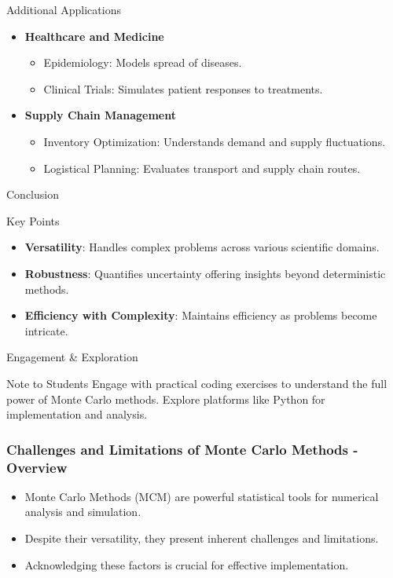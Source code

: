 \documentclass[aspectratio=169]{beamer}
\begin{document}
\begin{frame}{Additional Applications}
    \begin{itemize}
        \item \textbf{Healthcare and Medicine}
            \begin{itemize}
                \item Epidemiology: Models spread of diseases.
                \item Clinical Trials: Simulates patient responses to treatments.
            \end{itemize}
        \item \textbf{Supply Chain Management}
            \begin{itemize}
                \item Inventory Optimization: Understands demand and supply fluctuations.
                \item Logistical Planning: Evaluates transport and supply chain routes.
            \end{itemize}
    \end{itemize}
\end{frame}

\begin{frame}{Conclusion}
    \begin{block}{Key Points}
        \begin{itemize}
            \item \textbf{Versatility}: Handles complex problems across various scientific domains.
            \item \textbf{Robustness}: Quantifies uncertainty offering insights beyond deterministic methods.
            \item \textbf{Efficiency with Complexity}: Maintains efficiency as problems become intricate.
        \end{itemize}
    \end{block}
\end{frame}

\begin{frame}{Engagement & Exploration}
    \begin{block}{Note to Students}
        Engage with practical coding exercises to understand the full power of Monte Carlo methods. Explore platforms like Python for implementation and analysis.
    \end{block}
\end{frame}

\begin{frame}[fragile]
    \frametitle{Challenges and Limitations of Monte Carlo Methods - Overview}
    \begin{itemize}
        \item Monte Carlo Methods (MCM) are powerful statistical tools for numerical analysis and simulation.
        \item Despite their versatility, they present inherent challenges and limitations.
        \item Acknowledging these factors is crucial for effective implementation.
    \end{itemize}
\end{frame}
\end{document}
